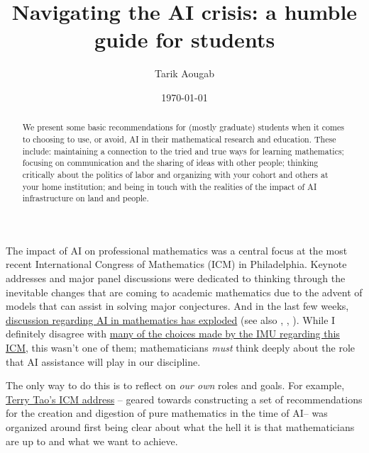 \documentclass[11pt,reqno]{amsart}
\theoremstyle{plain}
\theoremstyle{definition}
\numberwithin{equation}{section}
\numberwithin{theorem}{section}
\begin{document}
\title{Navigating the AI crisis: a humble guide for students}


\author{Tarik Aougab}
\address{Department of Mathematics, Haverford College, Haverford, PA 19041, USA}
\curraddr{}




\begin{abstract} We present some basic recommendations for (mostly graduate) students when it comes to choosing to use, or avoid, AI in their mathematical research and education. These include: maintaining a connection to the tried and true ways for learning mathematics; focusing on communication and the sharing of ideas with other people; thinking critically about the politics of labor and organizing with your cohort and others at your home institution; and being in touch with the realities of the impact of AI infrastructure on land and people. 
\end{abstract}

\date{\today}

\maketitle 

The impact of AI on professional mathematics was a central focus at the most recent International Congress of Mathematics (ICM) in Philadelphia. Keynote addresses and major panel discussions were dedicated to thinking through the inevitable changes that are coming to academic mathematics due to the advent of models that can assist in solving major conjectures. And in the last few weeks, \href{https://proofsandprompts.com/}{discussion regarding AI in mathematics has exploded} (see also \cite{ar:Weinreich}, \cite{ar:Hofer}, \cite{ar:Boldt}). While I definitely disagree with \href{https://sites.google.com/view/icm2026boycott/home}{many of the choices made by the IMU regarding this ICM}, this wasn’t one of them; mathematicians \textit{must} think deeply about the role that AI assistance will play in our discipline. 

The only way to do this is to reflect on \textit{our own} roles and goals. For example, \href{https://www.youtube.com/watch?v=M0--ZH1lOzg}{Terry Tao’s ICM address} \cite{Talk:Tao}– geared towards constructing a set of recommendations for the creation and digestion of pure mathematics in the time of AI– was organized around first being clear about what the hell it is that mathematicians are up to and what we want to achieve. 
\end{document}
